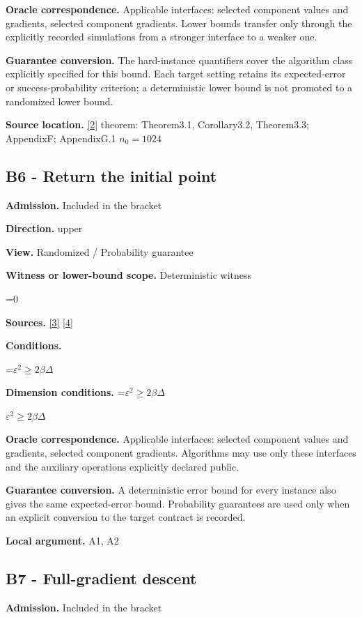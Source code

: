\documentclass[10pt,a4paper]{article}
\newcommand{\AtlasMath}[1]{\par\begingroup\centering\setbox0=\hbox{$\displaystyle #1$}\ifdim\wd0>1.4\linewidth\typeout{ATLAS WIDE FORMULA: \the\wd0}\fi\ifdim\wd0>\linewidth\resizebox{\linewidth}{!}{\box0}\else\box0\fi\par\endgroup}
\newcommand{\AtlasInlineMath}[1]{\begingroup\setbox0=\hbox{$#1$}\ifdim\wd0>.4\linewidth\endgroup\AtlasMath{#1}\else\endgroup$#1$\fi}
\begin{document}
\textbf{Oracle correspondence.} Applicable interfaces: selected component values and gradients, selected component gradients. Lower bounds transfer only through the explicitly recorded simulations from a stronger interface to a weaker one.

\textbf{Guarantee conversion.} The hard-instance quantifiers cover the algorithm class explicitly specified for this bound. Each target setting retains its expected-error or success-probability criterion; a deterministic lower bound is not promoted to a randomized lower bound.

\textbf{Source location.} \href{https://arxiv.org/pdf/2609.00045v3}{[2]} theorem: Theorem3.1, Corollary3.2, Theorem3.3; AppendixF; AppendixG.1 $n_0=1024$

\subsection{B6 - Return the initial point}
\textbf{Admission.} Included in the bracket

\textbf{Direction.} upper

\textbf{View.} Randomized / Probability guarantee

\textbf{Witness or lower-bound scope.} Deterministic witness

\AtlasMath{0}
\textbf{Sources.} \href{https://proceedings.mlr.press/v97/zhou19b/zhou19b.pdf}{[3]} \href{https://arxiv.org/pdf/1405.4980}{[4]}

\textbf{Conditions.} 
\AtlasMath{\varepsilon^2\ge2\beta\Delta}


\textbf{Dimension conditions.} \AtlasInlineMath{\varepsilon^2\ge2\beta\Delta}

\textbf{Oracle correspondence.} Applicable interfaces: selected component values and gradients, selected component gradients. Algorithms may use only these interfaces and the auxiliary operations explicitly declared public.

\textbf{Guarantee conversion.} A deterministic error bound for every instance also gives the same expected-error bound. Probability guarantees are used only when an explicit conversion to the target contract is recorded.

\textbf{Local argument.} A1, A2

\subsection{B7 - Full-gradient descent}
\textbf{Admission.} Included in the bracket
\end{document}

